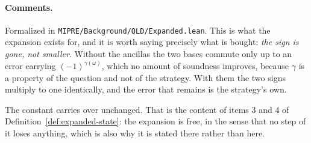 \paragraph{Comments.} Formalized in \texttt{MIPRE/Background/QLD/Expanded.lean}. This is what the
expansion exists for, and it is worth saying precisely what is bought: \emph{the sign is gone, not
smaller}. Without the ancillas the two bases commute only up to an error carrying
$(-1)^{\gamma(\omega)}$, which no amount of soundness improves, because $\gamma$ is a property of
the question and not of the strategy. With them the two signs multiply to one identically, and the
error that remains is the strategy's own.

The constant carries over unchanged. That is the content of items 3 and 4 of
Definition~\ref{def:expanded-state}: the expansion is free, in the sense that no step of it loses
anything, which is also why it is stated there rather than here.

\effortHard

